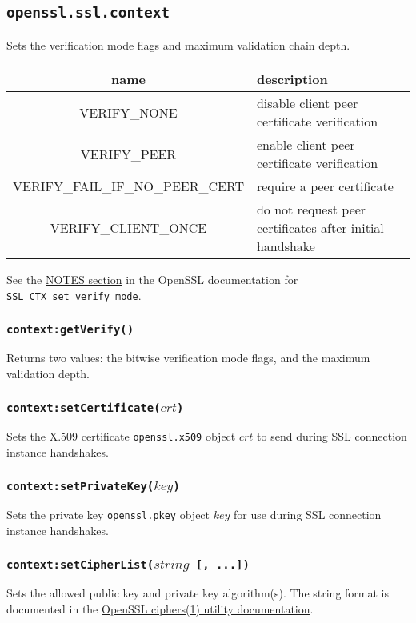 \documentclass[11pt, oneside]{memoir}
\newcommand*{\fn}[1]{\texttt{#1}\xspace}
\newcommand*{\module}[1]{\texttt{#1}\xspace}
\newcounter{toccols}
\newenvironment{Module}[1]{
	\subsection{\texttt{#1}}
	\addtocontents{toc}{
		\protect\begin{multicols}{\value{toccols}}
	}
}{
	\addtocontents{toc}{\protect\end{multicols}}
}
\begin{document}
\begin{Module}{openssl.ssl.context}
Sets the verification mode flags and maximum validation chain depth.

\begin{tabular}{ c | l }
name & description \\\hline
VERIFY\_NONE & disable client peer certificate verification \\
VERIFY\_PEER & enable client peer certificate verification \\
VERIFY\_FAIL\_IF\_NO\_PEER\_CERT & require a peer certificate \\
VERIFY\_CLIENT\_ONCE & do not request peer certificates after initial handshake
\end{tabular}

See the \href{http://www.openssl.org/docs/ssl/SSL_CTX_set_verify.html#NOTES}{NOTES section} in the OpenSSL documentation for \fn{SSL\_CTX\_set\_verify\_mode}.

\subsubsection[\fn{context:getVerify}]{\fn{context:getVerify()}}

Returns two values: the bitwise verification mode flags, and the maximum validation depth.

\subsubsection[\fn{context:setCertificate}]{\fn{context:setCertificate($crt$)}}

Sets the X.509 certificate \module{openssl.x509} object $crt$ to send during SSL connection instance handshakes.

\subsubsection[\fn{context:setPrivateKey}]{\fn{context:setPrivateKey($key$)}}

Sets the private key \module{openssl.pkey} object $key$ for use during SSL connection instance handshakes.

\subsubsection[\fn{context:setCipherList}]{\fn{context:setCipherList($string$ [, ...])}}

Sets the allowed public key and private key algorithm(s). The string format is documented in the \href{http://www.openssl.org/docs/apps/ciphers.html#CIPHER_LIST_FORMAT}{OpenSSL ciphers(1) utility documentation}.


\end{Module}
\end{document}
